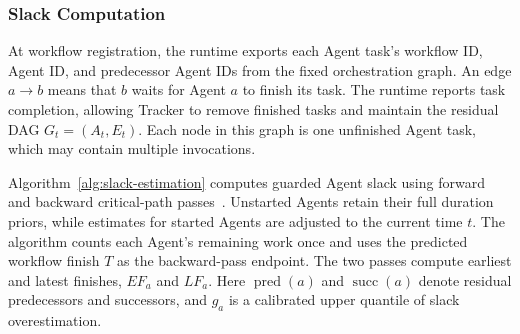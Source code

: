 \subsubsection{Slack Computation}
\label{sec:tracker-slack}

At workflow registration, the runtime exports each Agent task's workflow
ID, Agent ID, and predecessor Agent IDs from the fixed orchestration graph.
An edge $a\to b$ means that $b$ waits for Agent $a$ to finish its task.
The runtime reports task completion, allowing Tracker to remove finished
tasks and maintain the residual DAG $G_t=(A_t,E_t)$. Each node in this
graph is one unfinished Agent task, which may contain multiple invocations.

Algorithm~\ref{alg:slack-estimation} computes guarded Agent slack using
forward and backward critical-path passes~\cite{kelley1959cpm}.
Unstarted Agents retain their full duration priors, while estimates for
started Agents are adjusted to the current time $t$. The algorithm counts
each Agent's remaining work once and uses the predicted workflow finish
$T$ as the backward-pass endpoint. The two passes compute earliest and
latest finishes, $EF_a$ and $LF_a$. Here $\operatorname{pred}(a)$ and
$\operatorname{succ}(a)$ denote residual predecessors and successors,
and $g_a$ is a calibrated upper quantile of slack overestimation.


